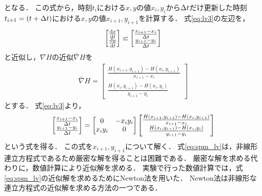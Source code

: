 となる． 
この式から，時刻$t_i$における$x,y$の値$x_i,y_i$から$\Delta t$だけ更新した時刻$t_{i+1} = (t + \Delta t)$における$x,y$の値$x_{i+1},y_{i+1}$を計算する．
式\eqref{eq:lv3}の左辺を，
\begin{align}
    \begin{bmatrix}
        \frac{\mathrm{d}x}{\mathrm{d}t} \\ 
        \frac{\mathrm{d}y}{\mathrm{d}t}
    \end{bmatrix}
     \backsimeq 
    \begin{bmatrix}
        \frac{x_{i+1} - x_i}{\Delta t} \\
         \frac{y_{i+1} - y_i}{\Delta t}
    \end{bmatrix}
\end{align}
と近似し，$\nabla H$の近似$\bar{\nabla}H$を
\begin{align}
    \bar{\nabla}H = 
    \begin{bmatrix}
        \frac{H(x_{i+1},y_{i+1}) - H(x_i,y_{i+1})}{x_{i+1} - x_i} \\
        \frac{H(x_{i},y_{i+1}) - H(x_i,y_i)}{y_{i+1} - y_i}
    \end{bmatrix}
\end{align}
とする．
式\eqref{eq:lv3}より，
\begin{align}
    \label{eq:spm_lv}
    \begin{bmatrix}
        \frac{x_{i+1} - x_i}{\Delta t} \\
         \frac{y_{i+1} - y_i}{\Delta t}
    \end{bmatrix}
    = 
    \begin{bmatrix}
        0 & -x_i y_i \\
        x_i y_i & 0
    \end{bmatrix}
    \begin{bmatrix}
        \frac{H(x_{i+1},y_{i+1}) - H(x_i,y_{i+1})}{x_{i+1} - x_i} \\
        \frac{H(x_{i},y_{i+1}) - H(x_i,y_i)}{y_{i+1} - y_i}
    \end{bmatrix}
\end{align}
という式を得る．
この式を$x_{i+1},y_{i+1}$について解く．
式\eqref{eq:spm_lv}は，非線形連立方程式であるため厳密な解を得ることは困難である．
厳密な解を求める代わりに，数値計算により近似解を求める．
実験で行った数値計算では，式\eqref{eq:spm_lv}の近似解を求めるためにNewton法を用いた．
Newton法は非線形な連立方程式の近似解を求める方法の一つである．

